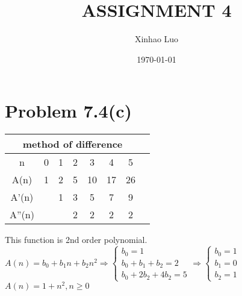 \documentclass{article}
\title{\bf \Large ASSIGNMENT 4}
\author{Xinhao Luo}
\date{\today}
\def\math#1{$#1$}
\begin{document}
\maketitle
\medskip

\section{Problem 7.4(c)}

\begin{center}
    \begin{tabular}{ |c|c|c|c|c|c|c|c| } 
    \hline
    \multicolumn{7}{|c|}{method of difference} \\
     \hline
        n & 0 & 1 & 2 & 3 & 4 & 5 \\
        \hline
        A(n) & 1 & 2 & 5 & 10 & 17 & 26\\ 
        \hline
        A'(n) & & 1 & 3 & 5 & 7 & 9 \\
        \hline
        A''(n) & & & 2 & 2 & 2 & 2 \\
     \hline
    \end{tabular}
\end{center}

This function is 2nd order polynomial. \\

\math{A(n) = b_0 + b_1n + b_2n^2 \Rightarrow
    \begin{cases} 
        b_0 = 1 \\ 
        b_0 + b_1 + b_2 = 2 \\
        b_0 + 2b_2 + 4b_2 = 5
    \end{cases} \Rightarrow
    \begin{cases} 
        b_0 = 1 \\ 
        b_1 = 0 \\
        b_2 = 1
    \end{cases} 
} \\
\math{A(n) = 1 + n^2, n \geq 0} \\
\end{document}

